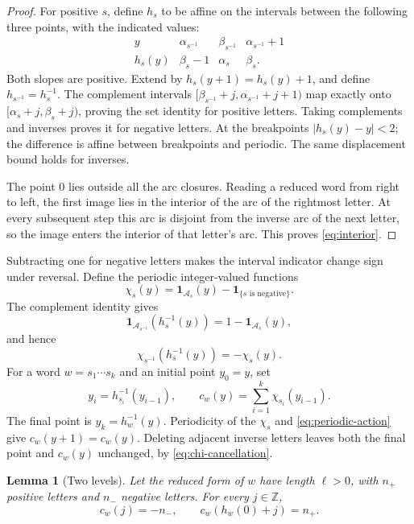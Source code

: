 \documentclass[11pt]{article}
\newtheorem{lemma}[theorem]{Lemma}
\theoremstyle{definition}
\theoremstyle{remark}
\newcommand{\Z}{\mathbb Z}
\newcommand{\one}{\mathbf 1}
\newcommand{\cA}{\mathcal A}
\begin{document}
\begin{proof}
For positive $s$, define $h_s$ to be affine on the intervals between
the following three points, with the indicated values:
\[
 \begin{array}{c|ccc}
 y&\alpha_{s^{-1}}&\beta_{s^{-1}}&\alpha_{s^{-1}}+1\\ \hline
 h_s(y)&\beta_s-1&\alpha_s&\beta_s.
 \end{array}
\]
Both slopes are positive. Extend by $h_s(y+1)=h_s(y)+1$, and define
$h_{s^{-1}}=h_s^{-1}$.
The complement intervals
$[\beta_{s^{-1}}+j,\alpha_{s^{-1}}+j+1)$ map exactly onto
$[\alpha_s+j,\beta_s+j)$, proving the set identity for positive letters.
Taking complements and inverses proves it for negative letters.
At the breakpoints $|h_s(y)-y|<2$; the difference is affine between
breakpoints and periodic. The same displacement bound holds for inverses.

The point $0$ lies outside all the arc closures. Reading a reduced word
from right to left, the first image lies in the interior of the arc of
the rightmost letter. At every subsequent step this arc is disjoint
from the inverse arc of the next letter, so the image enters the interior
of that letter's arc. This proves \eqref{eq:interior}.
\end{proof}

Subtracting one for negative letters makes the interval indicator change
sign under reversal. Define the periodic integer-valued functions
\begin{equation}\label{eq:chi}
 \chi_s(y)=\one_{\cA_s}(y)-\one_{\{s\text{ is negative}\}}.
\end{equation}
The complement identity gives
\[
 \one_{\cA_{s^{-1}}}(h_s^{-1}(y))=1-\one_{\cA_s}(y),
\]
and hence
\begin{equation}\label{eq:chi-cancellation}
 \chi_{s^{-1}}(h_s^{-1}(y))=-\chi_s(y).
\end{equation}
For a word $w=s_1\cdots s_k$ and an initial point $y_0=y$, set
\begin{equation}\label{eq:c-word}
 y_i=h_{s_i}^{-1}(y_{i-1}),\qquad
 c_w(y)=\sum_{i=1}^k\chi_{s_i}(y_{i-1}).
\end{equation}
The final point is $y_k=h_w^{-1}(y)$.
Periodicity of the $\chi_s$ and \eqref{eq:periodic-action} give
$c_w(y+1)=c_w(y)$.
Deleting adjacent inverse letters leaves both the final point and
$c_w(y)$ unchanged, by \eqref{eq:chi-cancellation}.

\begin{lemma}[Two levels]\label{lem:two-levels}
Let the reduced form of $w$ have length $\ell>0$, with $n_+$ positive
letters and $n_-$ negative letters. For every $j\in\Z$,
\begin{equation}\label{eq:two-levels}
 c_w(j)=-n_-,\qquad c_w(h_w(0)+j)=n_+.
\end{equation}
\end{lemma}
\end{document}
